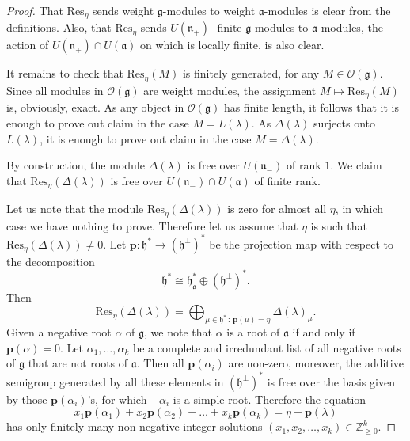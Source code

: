 \documentclass[a4paper]{amsart}
\begin{document}
\begin{proof}
That  $\mathrm{Res}_\eta$ sends weight $\mathfrak{g}$-modules 
to weight $\mathfrak{a}$-modules is clear from the definitions.
Also, that $\mathrm{Res}_\eta$ sends $U(\mathfrak{n}_+)$-
finite $\mathfrak{g}$-modules to $\mathfrak{a}$-modules,
the action of $U(\mathfrak{n}_+)\cap U(\mathfrak{a})$ on which 
is locally finite, is also clear. 

It remains to check that $\mathrm{Res}_\eta(M)$ is finitely
generated, for any $M\in \mathcal{O}(\mathfrak{g})$. Since
all modules in $\mathcal{O}(\mathfrak{g})$ are weight modules,
the assignment $M\mapsto \mathrm{Res}_\eta(M)$ is, obviously,
exact. As any object in $\mathcal{O}(\mathfrak{g})$ has finite
length, it follows that it is enough to prove out claim in the case
$M=L(\lambda)$. As $\Delta(\lambda)$ surjects onto $L(\lambda)$,
it is enough to prove out claim in the case $M=\Delta(\lambda)$.

By construction, the module $\Delta(\lambda)$ is free over
$U(\mathfrak{n}_-)$ of rank $1$. We claim that 
$\mathrm{Res}_\eta(\Delta(\lambda))$ is free over
$U(\mathfrak{n}_-)\cap U(\mathfrak{a})$ of finite rank.

Let us note that the module $\mathrm{Res}_\eta(\Delta(\lambda))$ 
is zero for almost all $\eta$, in which case we have nothing to prove.
Therefore let us assume that $\eta$ is such that 
$\mathrm{Res}_\eta(\Delta(\lambda))\neq 0$.
% 
Let $\mathbf{p}:\mathfrak{h}^*\to (\mathfrak{h}^\perp)^*$
be the projection map with respect to the decomposition
\begin{displaymath}
\mathfrak{h}^*\cong \mathfrak{h}_\mathfrak{a}^*\oplus 
(\mathfrak{h}^\perp)^*.
\end{displaymath}
Then
\begin{displaymath}
\mathrm{Res}_\eta(\Delta(\lambda))=
\bigoplus_{\mu\in\mathfrak{h}^*\,:\,\mathbf{p}(\mu)=\eta}\Delta(\lambda)_\mu.
\end{displaymath}
Given a negative root $\alpha$ of $\mathfrak{g}$, we note that 
$\alpha$ is a root of $\mathfrak{a}$ if and only if 
$\mathbf{p}(\alpha)=0$. Let $\alpha_1,\dots,\alpha_k$ be a 
complete and irredundant
list of all negative roots of $\mathfrak{g}$ that are not 
roots of $\mathfrak{a}$. Then all $\mathbf{p}(\alpha_i)$ are non-zero,
moreover, the additive semigroup generated by all these elements in 
$(\mathfrak{h}^\perp)^*$ is free over the basis given by
those $\mathbf{p}(\alpha_i)$'s, for which $-\alpha_i$ is a simple root.
Therefore the equation
\begin{equation}\label{eq-gvm}
x_1\mathbf{p}(\alpha_1)+x_2\mathbf{p}(\alpha_2)+\dots + 
x_k\mathbf{p}(\alpha_k)  =\eta-\mathbf{p}(\lambda)
\end{equation}
has only finitely many non-negative integer solutions
$(x_1,x_2,\dots,x_k)\in\mathbb{Z}_{\geq 0}^k$.


\end{proof}
\end{document}

